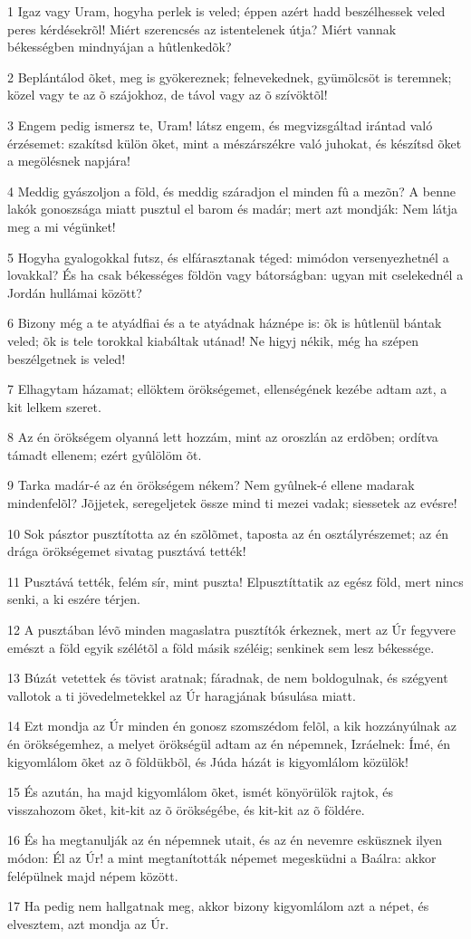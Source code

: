 \par 1 Igaz vagy Uram, hogyha perlek is veled; éppen azért hadd beszélhessek veled peres kérdésekrõl! Miért szerencsés az istentelenek útja? Miért vannak békességben mindnyájan a hûtlenkedõk?
\par 2 Beplántálod õket, meg is gyökereznek; felnevekednek, gyümölcsöt is teremnek; közel vagy te az õ szájokhoz, de távol vagy az õ szívöktõl!
\par 3 Engem pedig ismersz te, Uram! látsz engem, és megvizsgáltad irántad való érzésemet: szakítsd külön õket, mint a mészárszékre való juhokat, és készítsd õket a  megölésnek napjára!
\par 4 Meddig gyászoljon a föld, és meddig száradjon el minden fû a mezõn? A benne lakók gonoszsága miatt pusztul el barom és  madár; mert azt mondják: Nem látja meg a mi végünket!
\par 5 Hogyha gyalogokkal futsz, és elfárasztanak téged: mimódon versenyezhetnél a lovakkal? És ha csak békességes földön vagy bátorságban: ugyan mit cselekednél a Jordán hullámai között?
\par 6 Bizony még a te atyádfiai és a te atyádnak háznépe is: õk is hûtlenül bántak veled; õk is tele torokkal kiabáltak utánad! Ne higyj nékik, még ha szépen beszélgetnek is veled!
\par 7 Elhagytam házamat; ellöktem örökségemet, ellenségének kezébe adtam azt, a kit lelkem szeret.
\par 8 Az én örökségem olyanná lett hozzám, mint az oroszlán az erdõben; ordítva támadt ellenem; ezért gyûlölöm õt.
\par 9 Tarka madár-é az én örökségem nékem? Nem gyûlnek-é ellene madarak mindenfelõl? Jõjjetek, seregeljetek össze mind ti mezei vadak; siessetek az evésre!
\par 10 Sok pásztor pusztította az én szõlõmet, taposta az én osztályrészemet; az én drága örökségemet sivatag pusztává tették!
\par 11 Pusztává tették, felém sír, mint puszta! Elpusztíttatik az egész föld, mert nincs senki, a ki eszére térjen.
\par 12 A pusztában lévõ minden magaslatra pusztítók érkeznek, mert az Úr fegyvere emészt a föld egyik szélétõl a föld másik széléig; senkinek sem lesz békessége.
\par 13 Búzát vetettek és tövist aratnak; fáradnak, de nem boldogulnak, és szégyent vallotok a ti jövedelmetekkel az Úr haragjának búsulása miatt.
\par 14 Ezt mondja az Úr minden én gonosz szomszédom felõl, a kik hozzányúlnak az én örökségemhez, a melyet örökségül adtam az én népemnek, Izráelnek: Ímé, én kigyomlálom õket az õ földükbõl, és Júda házát is kigyomlálom közülök!
\par 15 És azután, ha majd kigyomlálom õket, ismét könyörülök rajtok, és visszahozom õket, kit-kit az õ örökségébe, és kit-kit az õ földére.
\par 16 És ha megtanulják az én népemnek utait, és az én nevemre esküsznek ilyen módon: Él az Úr! a mint megtanították népemet megesküdni a Baálra: akkor felépülnek majd népem között.
\par 17 Ha pedig nem hallgatnak meg, akkor bizony kigyomlálom azt a népet, és elvesztem, azt mondja az Úr.

